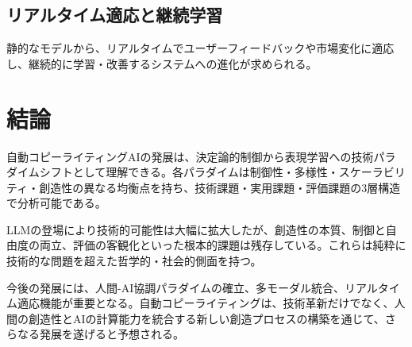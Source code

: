 \documentclass[11pt, a4paper]{article}
\begin{document}
\subsection{リアルタイム適応と継続学習}

静的なモデルから、リアルタイムでユーザーフィードバックや市場変化に適応し、継続的に学習・改善するシステムへの進化が求められる。

\section{結論}

自動コピーライティングAIの発展は、決定論的制御から表現学習への技術パラダイムシフトとして理解できる。各パラダイムは制御性・多様性・スケーラビリティ・創造性の異なる均衡点を持ち、技術課題・実用課題・評価課題の3層構造で分析可能である。

LLMの登場により技術的可能性は大幅に拡大したが、創造性の本質、制御と自由度の両立、評価の客観化といった根本的課題は残存している。これらは純粋に技術的な問題を超えた哲学的・社会的側面を持つ。

今後の発展には、人間-AI協調パラダイムの確立、多モーダル統合、リアルタイム適応機能が重要となる。自動コピーライティングは、技術革新だけでなく、人間の創造性とAIの計算能力を統合する新しい創造プロセスの構築を通じて、さらなる発展を遂げると予想される。



\end{document}
